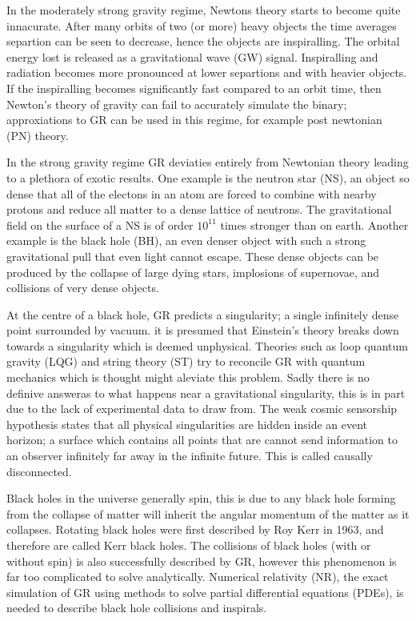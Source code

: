In the moderately strong gravity regime, Newtons theory starts to become quite innacurate. After many orbits of two (or more) heavy objects the time averages separtion can be seen to decrease, hence the objects are inspiralling. The orbital energy lost is released as a gravitational wave (GW) signal. Inspiralling and radiation becomes more pronounced at lower separtions and with heavier objects. If the inspiralling becomes significantly fast compared to an orbit time, then Newton's theory of gravity can fail to accurately simulate the binary; approxiations to GR can be used in this regime, for example post newtonian (PN) theory.

In the strong gravity regime GR deviaties entirely from Newtonian theory leading to a plethora of exotic results. One example is the neutron star (NS), an object so dense that all of the electons in an atom are forced to combine with nearby protons and reduce all matter to a dense lattice of neutrons. The gravitational field on the surface of a NS is of order $10^{11}$ times stronger than on earth. Another example is the black hole (BH), an even denser object with such a strong gravitational pull that even light cannot escape. These dense objects can be produced by the collapse of large dying stars, implosions of supernovae, and collisions of very dense objects.

At the centre of a black hole, GR predicts a singularity; a single infinitely dense point surrounded by vacuum. it is presumed that Einstein's theory breaks down towards a singularity which is deemed unphysical. Theories such as loop quantum gravity (LQG) and string theory (ST) try to reconcile GR with quantum mechanics which is thought might aleviate this problem. Sadly there is no definive answeras to what happens near a gravitational singularity, this is in part due to the lack of experimental data to draw from. The weak cosmic sensorship hypothesis states that all physical singularities are hidden inside an event horizon; a surface which contains all points that are cannot send information to an observer infinitely far away in the infinite future. This is called causally disconnected. 

Black holes in the universe generally spin, this is due to any black hole forming from the collapse of matter will inherit the angular momentum of the matter as it collapses. Rotating black holes were first described by Roy Kerr in 1963, and therefore are called Kerr black holes. The collisions of black holes (with or without spin) is also successfully described by GR, however this phenomenon is far too complicated to solve analytically. Numerical relativity (NR), the exact simulation of GR using methods to solve partial differential equations (PDEs), is needed to describe black hole collisions and inspirals. 

